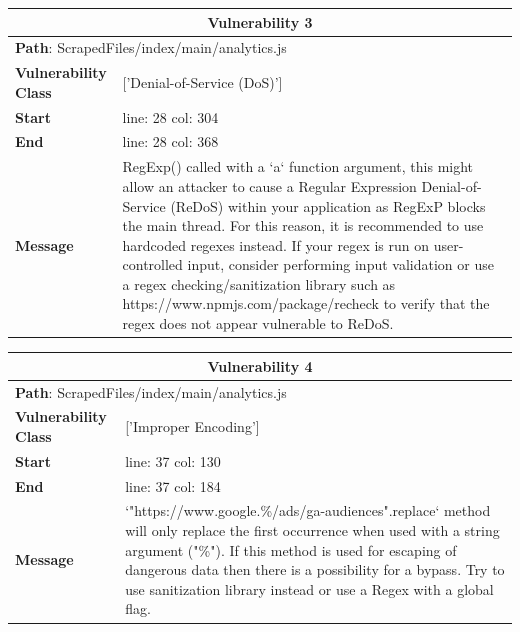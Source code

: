 \documentclass[12pt]{article}
\begin{document}
\vspace{0.7cm}
\FloatBarrier
\begin{table}[!h]
\centering
\renewcommand{\arraystretch}{1.3}
\begin{tabular}{|l|p{10cm}|}
\hline
\multicolumn{2}{|c|}{\textbf{Vulnerability 3}} \\
\hline
\multicolumn{2}{|l|}{\textbf{Path}: ScrapedFiles/index/main/analytics.js} \\
\hline
\textbf{Vulnerability Class} & ['Denial-of-Service (DoS)'] \\
\hline
\textbf{Start} & line: 28 \quad col: 304 \\
\hline
\textbf{End} & line: 28 \quad col: 368 \\
\hline
\textbf{Message} & RegExp() called with a `a` function argument, this might allow an attacker to cause a Regular Expression Denial-of-Service (ReDoS) within your application as RegExP blocks the main thread. For this reason, it is recommended to use hardcoded regexes instead. If your regex is run on user-controlled input, consider performing input validation or use a regex checking/sanitization library such as https://www.npmjs.com/package/recheck to verify that the regex does not appear vulnerable to ReDoS. \\
\hline
\end{tabular}
\end{table}
\vspace{0.7cm}
\FloatBarrier
\begin{table}[!h]
\centering
\renewcommand{\arraystretch}{1.3}
\begin{tabular}{|l|p{10cm}|}
\hline
\multicolumn{2}{|c|}{\textbf{Vulnerability 4}} \\
\hline
\multicolumn{2}{|l|}{\textbf{Path}: ScrapedFiles/index/main/analytics.js} \\
\hline
\textbf{Vulnerability Class} & ['Improper Encoding'] \\
\hline
\textbf{Start} & line: 37 \quad col: 130 \\
\hline
\textbf{End} & line: 37 \quad col: 184 \\
\hline
\textbf{Message} & `"https://www.google.\%/ads/ga-audiences".replace` method will only replace the first occurrence when used with a string argument ("\%"). If this method is used for escaping of dangerous data then there is a possibility for a bypass. Try to use sanitization library instead or use a Regex with a global flag. \\
\hline
\end{tabular}
\end{table}
\vspace{0.7cm}
\FloatBarrier
\end{document}
